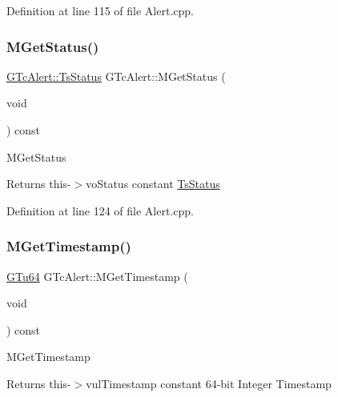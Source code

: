 Definition at line 115 of file Alert.\+cpp.

\mbox{\label{class_g_n_common_1_1_g_tc_alert_a8f37913185860432ccdd65dea58ffe37}} 
\subsubsection{\texorpdfstring{M\+Get\+Status()}{MGetStatus()}}
{\footnotesize\ttfamily \mbox{\hyperlink{struct_g_n_common_1_1_g_tc_alert_1_1_ts_status}{G\+Tc\+Alert\+::\+Ts\+Status}} G\+Tc\+Alert\+::\+M\+Get\+Status (\begin{DoxyParamCaption}\item[{void}]{ }\end{DoxyParamCaption}) const}

M\+Get\+Status \begin{DoxyReturn}{Returns}
this-\/$>$vo\+Status constant \mbox{\hyperlink{struct_g_n_common_1_1_g_tc_alert_1_1_ts_status}{Ts\+Status}} 
\end{DoxyReturn}


Definition at line 124 of file Alert.\+cpp.

\mbox{\label{class_g_n_common_1_1_g_tc_alert_ae00bea560ef82ed36c4b741d92bd27e6}} 
\subsubsection{\texorpdfstring{M\+Get\+Timestamp()}{MGetTimestamp()}}
{\footnotesize\ttfamily \mbox{\hyperlink{namespace_g_n_common_a01e8527dabf7ab4f123156b0701945eb}{G\+Tu64}} G\+Tc\+Alert\+::\+M\+Get\+Timestamp (\begin{DoxyParamCaption}\item[{void}]{ }\end{DoxyParamCaption}) const}

M\+Get\+Timestamp \begin{DoxyReturn}{Returns}
this-\/$>$vul\+Timestamp constant 64-\/bit Integer Timestamp 
\end{DoxyReturn}



